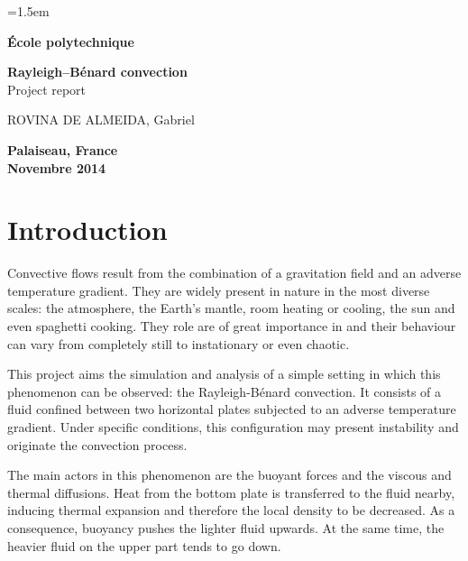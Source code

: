 \documentclass[12pt,oneside]{article}
\begin{document}
\baselineskip=1.5em
\thispagestyle{empty}

\begin{center}
{\Huge \bf École polytechnique}\\


\vspace{5cm}

{\LARGE{\bf Rayleigh–Bénard convection \\ }}
Project report

\vspace{6cm}
ROVINA DE ALMEIDA, Gabriel\\
\end{center}

\vspace{5cm}

\begin{center}
\textbf{Palaiseau, France \\  Novembre 2014}
\end{center}


\newpage
\thispagestyle{empty}

\setcounter{tocdepth}{3}
\tableofcontents

\listoffigures

\newpage
\setcounter{page}{1}
\section{Introduction}

Convective flows result from the combination of a gravitation field and an adverse temperature gradient. They are widely present in nature in the most diverse scales: the atmosphere, the Earth's mantle, room heating or cooling, the sun and even spaghetti cooking. They role are of great importance in and their behaviour can vary from completely still to instationary or even chaotic.

This project aims the simulation and analysis of a simple setting in which this phenomenon can be observed: the Rayleigh-Bénard convection. It consists of a fluid confined between two horizontal plates subjected to an adverse temperature gradient. Under specific conditions, this configuration may present instability and originate the convection process.

The main actors in this phenomenon are the buoyant forces and the viscous and thermal diffusions. Heat from the bottom plate is transferred to the fluid nearby, inducing thermal expansion and therefore the local density to be decreased. As a consequence, buoyancy pushes the lighter fluid upwards. At the same time, the heavier fluid on the upper part tends to go down.
\end{document}

